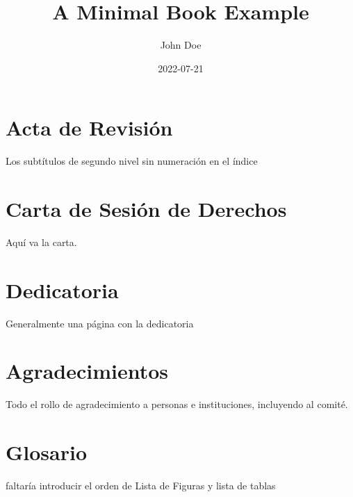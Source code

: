\documentclass[
  12pt,
]{book}
\title{A Minimal Book Example}
\author{John Doe}
\date{2022-07-21}
\theoremstyle{definition}
\theoremstyle{definition}
\theoremstyle{definition}
\theoremstyle{definition}
\theoremstyle{remark}
\begin{document}
\maketitle

{
\setcounter{tocdepth}{1}
\tableofcontents
}
\listoffigures
\listoftables
\newpage

\hypertarget{acta-de-revisiuxf3n}{%
\section*{Acta de Revisión}\label{acta-de-revisiuxf3n}}

Los subtítulos de segundo nivel sin numeración en el índice

\newpage

\hypertarget{carta-de-sesiuxf3n-de-derechos}{%
\section*{Carta de Sesión de Derechos}\label{carta-de-sesiuxf3n-de-derechos}}

Aquí va la carta.

\newpage

\hypertarget{dedicatoria}{%
\section*{Dedicatoria}\label{dedicatoria}}

Generalmente una página con la dedicatoria

\newpage

\hypertarget{agradecimientos}{%
\section*{Agradecimientos}\label{agradecimientos}}

Todo el rollo de agradecimiento a personas e instituciones, incluyendo al comité.

\newpage

\hypertarget{glosario}{%
\section*{Glosario}\label{glosario}}

faltaría introducir el orden de Lista de Figuras y lista de tablas
\end{document}
